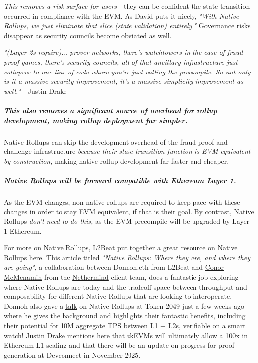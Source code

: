 \documentclass[12pt]{article}
\begin{document}
\textit{This removes a risk surface for users} - they can be confident the state transition occurred in compliance with the EVM. As David puts it nicely, \textit{"With Native Rollups, we just eliminate that slice (state validation) entirely."} Governance risks disappear as security councils become obviated as well. 

\begin{center}
    \textit{"(Layer 2s require)... prover networks, there's watchtowers in the case of fraud proof games, there's security councils, all of that ancillary infrastructure just collapses to one line of code where you're just calling the precompile. So not only is it a massive security improvement, it's a massive simplicity improvement as well."} - Justin Drake
\end{center}

\subparagraph{This also removes a significant source of overhead for rollup development, making rollup deployment far simpler.} Native Rollups can skip the development overhead of the fraud proof and challenge infrastructure \textit{because their state transition function is EVM equivalent by construction,} making native rollup development far faster and cheaper. 

\subparagraph{Native Rollups will be forward compatible with Ethereum Layer 1.} As the EVM changes, non-native rollups are required to keep pace with these changes in order to stay EVM equivalent, if that is their goal. By contrast, Native Rollups \textit{don't need to do this,} as the EVM precompile will be upgraded by Layer 1 Ethereum. 

For more on Native Rollups, L2Beat put together a great resource on Native Rollups \href{https://native-rollups.l2beat.com/}{here.} This \href{https://medium.com/l2beat/native-rollups-where-they-are-and-where-they-are-going-cb21eb103d46}{article} titled \textit{"Native Rollups: Where they are, and where they are going"}, a collaboration between Donnoh.eth from L2Beat and \href{https://x.com/ConorMcMenamin9}{Conor McMenamin} from the \href{https://x.com/NethermindEth}{Nethermind} client team, does a fantastic job exploring where Native Rollups are today and the tradeoff space between throughput and composability for different Native Rollups that are looking to interoperate. Donnoh also gave a \href{https://youtu.be/0O3JyJpMQLQ?si=6sAghjK242mx0W1t}{talk} on Native Rollups at Token 2049 just a few weeks ago where he gives the background and highlights their fantastic benefits, including their potential for 10M aggregate TPS between L1 + L2s, verifiable on a smart watch! Justin Drake mentions \href{https://x.com/drakefjustin/status/1978435449489158312}{here} that zkEVMs will ultimately allow a 100x in Ethereum L1 scaling and that there will be an update on progress for proof generation at Devconnect in November 2025. 
\end{document}
